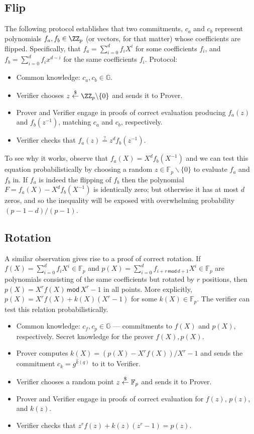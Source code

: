 \documentclass{article}
\theoremstyle{definition}
\begin{document}
\subsection{Flip}

The following protocol establishes that two commitments, $c_a$ and $c_b$ represent polynomials $f_a, f_b \in \ZZ_p$ (or vectors, for that matter) whose coefficients are flipped. Specifically, that $f_a = \sum_{i=0}^{d}f_i X^i$ for some coefficients $f_i$, and $f_b = \sum_{i=0}^df_ix^{d-i}$ for the same coefficients $f_i$.
Protocol:
\begin{itemize}
    \item Common knowledge: $c_a, c_b \in \mathbb{G}$.
    \item Verifier chooses $z \sample \ZZ_p \backslash \{0\}$ and sends it to Prover.
    \item Prover and Verifier engage in proofs of correct evaluation producing $f_a(z)$ and $f_b(z^{-1})$, matching $c_a$ and $c_b$, respectively.
    \item Verifier checks that $f_a(z) \stackrel{?}{=} z^d f_b(z^{-1})$.
\end{itemize}

To see why it works, observe that $f_a(X) = X^df_b(X^{-1})$ and we can test this equation probabilistically by choosing a random $z \in \mathbb{F}_p \backslash \{0\}$ to evaluate $f_a$ and $f_b$ in. If $f_a$ is indeed the flipping of $f_b$ then the polynomial $F = f_a(X) - X^df_b(X^{-1})$ is identically zero; but otherwise it has at most $d$ zeros, and so the inequality will be exposed with overwhelming probability $(p-1-d)/(p-1)$.

\subsection{Rotation}

A similar observation gives rise to a proof of correct rotation. If $f(X) = \sum_{i=0}^d f_i X^i \in \mathbb{F}_p$ and $p(X) = \sum_{i=0}^d f_{i+r \, \mathsf{mod} \, d+1} X^i \in \mathbb{F}_p$ are polynomials consisting of the same coefficients but rotated by $r$ positions, then $p(X) = X^r f(X) \, \mathsf{mod} \, X^r - 1$ in all points. More explicitly, $p(X) = X^r f(X) + k(X) (X^r - 1)$ for some $k(X) \in \mathbb{F}_p$. The verifier can test this relation probabilistically.

\begin{itemize}
    \item Common knowledge: $c_f, c_p \in \mathbb{G}$ --- commitments to $f(X)$ and $p(X)$, respectively. Secret knowledge for the prover $f(X), p(X)$.
    \item Prover computes $k(X) = (p(X) - X^r f(X)) / X^r - 1$ and sends the commitment $c_k = g^{\hat{k}(q)}$ to it to Verifier.
    \item Verifier chooses a random point $z \overset{\$}{\gets} \mathbb{F}_p$ and sends it to Prover.
    \item Prover and Verifier engage in proofs of correct evaluation for $f(z)$, $p(z)$, and $k(z)$.
    \item Verifier checks that $z^r f(z) + k(z) (z^r-1) = p(z)$.
\end{itemize}
\end{document}
